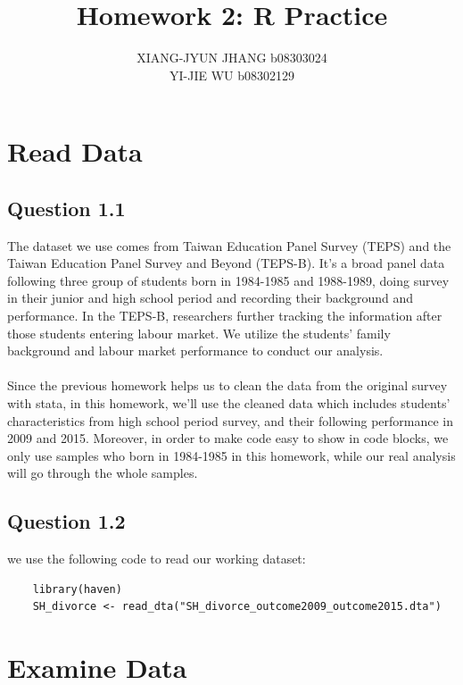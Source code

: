 \documentclass[11pt, letterpaper]{article}
\title{Homework 2: R Practice}
\author{XIANG-JYUN JHANG b08303024 \\ YI-JIE WU b08302129}
\begin{document}
\maketitle



\section{Read Data}


\subsection*{Question 1.1}

The dataset we use comes from Taiwan Education Panel Survey (TEPS) and the Taiwan Education Panel Survey and Beyond (TEPS-B).
It's a broad panel data following three group of students born in 1984-1985 and 1988-1989, doing survey in their junior and high school period and recording their background and performance.  
In the TEPS-B, researchers further tracking the information after those students entering labour market.  We utilize the students' family background and labour market performance to conduct our analysis. 
\\
\\
Since the previous homework helps us to clean the data from the original survey with stata, in this homework, we'll use the cleaned data which includes students' characteristics from high school period survey, and their following performance in 2009 and 2015. Moreover, in order to make code easy to show in code blocks, we only use samples who born in 1984-1985 in this homework, while our real analysis will go through the whole samples.


\subsection*{Question 1.2}

we use the following code to read our working dataset:

\begin{lstlisting}
    library(haven)
    SH_divorce <- read_dta("SH_divorce_outcome2009_outcome2015.dta")
\end{lstlisting}



\section{Examine Data}
\end{document}
